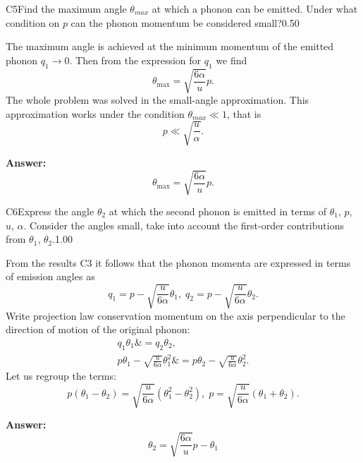 \documentclass[11pt,a4paper]{article}
\begin{document}
\begin{solcard}{C5}{Find the maximum angle $\theta_{max}$ at which a phonon can be emitted. Under what condition on $p$ can the phonon momentum be considered small?}{0.50}

The maximum angle is achieved at the minimum momentum of the emitted phonon $q_1 \to 0$. Then from the expression for $q_1$ we find $$ \theta_{\max} = \sqrt{\frac{6 \alpha}{u}} p. $$The whole problem was solved in the small-angle approximation. This approximation works under the condition $\theta_{max} \ll 1$, that is $$ p \ll \sqrt{\frac{u}{\alpha}}. $$

\par\smallskip\noindent\textbf{Answer:} $$ \theta_{\max} = \sqrt{\frac{6 \alpha}{u}} p. $$
\end{solcard}

\begin{solcard}{C6}{Express the angle $\theta_2$ at which the second phonon is emitted in terms of $\theta_1$, $p$, $u$, $\alpha$. Consider the angles small, take into account the first-order contributions from $\theta_1$, $\theta_2$.}{1.00}

From the results $\mathrm{C3}$ it follows that the phonon momenta are expressed in terms of emission angles as $$ q_1 = p - \sqrt{\frac{u}{6 \alpha}} \theta_1, \; q_2 = p - \sqrt{\frac{u}{6 \alpha}} \theta_2. $$ Write projection law conservation momentum on the axis perpendicular to the direction of motion of the original phonon: \begin{align*} q_1 \theta_1 \&= q_2 \theta_2, \\ p \theta_1 -  \sqrt{\frac{u}{6 \alpha}} \theta_1^2  \&=  p \theta_2 -  \sqrt{\frac{u}{6 \alpha}} \theta_2^2. \end{align*} Let us regroup the terms: $$ p(\theta_1 - \theta_2) = \sqrt{\frac{u}{6 \alpha}} (\theta_1^2 -\theta_2^2), \; p = \sqrt{\frac{u}{6 \alpha}} (\theta_1 + \theta_2). $$

\par\smallskip\noindent\textbf{Answer:} $$ \theta_2 = \sqrt{\frac{6 \alpha}{u}} p - \theta_1 $$
\end{solcard}
\end{document}
